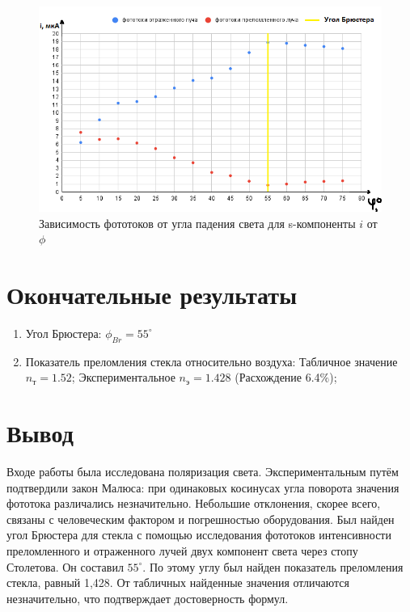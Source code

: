 \documentclass{article}
\begin{document}
\begin{figure}[h!]
    \begin{center}
    \includegraphics[scale=0.7]{chart3.png}
    \caption{Зависимость фототоков от угла падения света для s-компоненты $i$ от $\phi$}
    \label{fig:graphUfromI}    
    \end{center}
\end{figure}
\newpage
\section{Окончательные результаты}
\begin{enumerate}
    \item Угол Брюстера: $\phi_{Br} = 55^\circ$  
    \item Показатель преломления стекла относительно воздуха: Табличное значение $n_{\textit{т}} = 1.52$; Экспериментальное $n_{\textit{э}} = 1.428$ (Расхождение 6.4$\%$);
\end{enumerate}
\newpage
\section{Вывод}
Входе работы была исследована поляризация света. Экспериментальным путём
подтвердили закон Малюса: при одинаковых косинусах угла поворота значения фототока различались незначительно. Небольшие отклонения, скорее всего, связаны с человеческим фактором и погрешностью оборудования. Был найден угол Брюстера для стекла с помощью исследования фототоков интенсивности преломленного
и отраженного лучей двух компонент света через стопу Столетова. Он составил $55^\circ$. По этому углу был найден показатель преломления стекла, равный 1,428. От табличных найденные значения отличаются незначительно,
что подтверждает достоверность формул.
\end{document}
